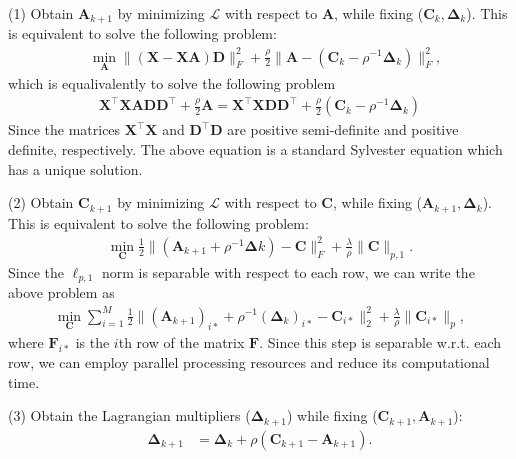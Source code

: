 \documentclass[10pt,twocolumn,letterpaper]{article}
\begin{document}
(1) Obtain $\bm{A}_{k+1}$ by minimizing $\mathcal{L}$ with respect to $\bm{A}$, while fixing ($\bm{C}_{k},\bm{\Delta}_{k}$). This is equivalent to solve the following problem:
\begin{equation}
\begin{split}
\label{e8}
&
\min_{\bm{A}}
\|
(\bm{X}
-
\bm{X}\bm{A})
\bm{D}
\|_{F}^{2}
+
\frac{\rho}{2}
\|
\bm{A}
-(
\bm{C}_{k}
-
\rho^{-1}
\bm{\Delta}_{k}
)
\|_{F}^{2},
\end{split}
\end{equation}
which is equalivalently to solve the following problem
\begin{equation}
\begin{split}
\label{e8}
\bm{X}^{\top}\bm{X}\bm{A}\bm{D}\bm{D}^{\top}
+
\frac{\rho}{2}
\bm{A}
=
\bm{X}^{\top}\bm{X}\bm{D}\bm{D}^{\top}
+
\frac{\rho}{2}
(
\bm{C}_{k}
-
\rho^{-1}
\bm{\Delta}_{k}
)
\end{split}
\end{equation}
Since the matrices $\bm{X}^{\top}\bm{X}$ and $\bm{D}^{\top}\bm{D}$ are positive semi-definite and positive definite, respectively. The above equation is a standard Sylvester equation which has a unique solution.


(2) Obtain $\bm{C}_{k+1}$ by minimizing $\mathcal{L}$ with respect to $\bm{C}$, while fixing ($\bm{A}_{k+1},\bm{\Delta}_{k}$). This is equivalent to solve the following problem:
\begin{equation}
\begin{split}
\label{e6}
\min_{\bm{C}}
\frac{1}{2}
\|
(\bm{A}_{k+1}+\rho^{-1}\bm{\Delta}{k})
-
\bm{C}
\|_{F}^{2}
+
\frac{\lambda}{\rho}
\|
\bm{C}
\|_{p,1}.
\end{split}
\end{equation}
Since the $\ell_{p,1}$ norm is separable with respect to each row, we can write the above problem as 
\begin{equation}
\begin{split}
\label{e6}
\min_{\bm{C}}
\sum_{i=1}^{M}
\frac{1}{2}
\|
(\bm{A}_{k+1})_{i*}+\rho^{-1}(\bm{\Delta}_{k})_{i*}
-
\bm{C}_{i*}
\|_{2}^{2}
+
\frac{\lambda}{\rho}
\|
\bm{C}_{i*}
\|_{p},
\end{split}
\end{equation}
where $\bm{F}_{i*}$ is the $i$th row of the matrix $\bm{F}$. Since this step is separable w.r.t. each row, we can employ parallel processing resources and reduce its computational time.


(3) Obtain the Lagrangian multipliers ($\bm{\Delta}_{k+1}$) while fixing ($\bm{C}_{k+1},\bm{A}_{k+1}$):
\begin{equation}
\begin{split}
\label{e10}
\bm{\Delta}_{k+1}
&
=
\bm{\Delta}_{k}
+
\rho
(\bm{C}_{k+1}-\bm{A}_{k+1})
.
\end{split}
\end{equation}
\end{document}
